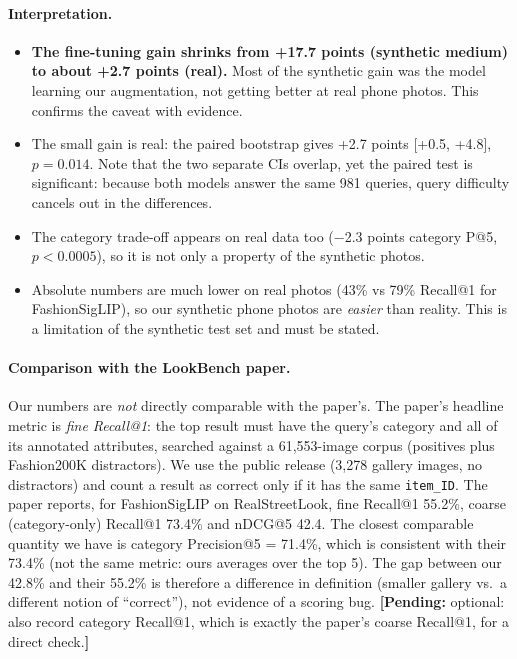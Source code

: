 \documentclass[11pt,a4paper]{article}
\newcommand{\pending}[1]{\textcolor{orange!80!black}{\textbf{[Pending:} #1\textbf{]}}}
\begin{document}
\paragraph{Interpretation.}
\begin{itemize}
  \item \textbf{The fine-tuning gain shrinks from +17.7 points (synthetic medium) to about +2.7
        points (real).} Most of the synthetic gain was the model learning our augmentation, not getting
        better at real phone photos. This confirms the caveat with evidence.
  \item The small gain is real: the paired bootstrap gives +2.7 points [+0.5, +4.8], $p=0.014$.
        Note that the two separate CIs overlap, yet the paired test is significant: because both models
        answer the same 981 queries, query difficulty cancels out in the differences.
  \item The category trade-off appears on real data too ($-$2.3 points category P@5, $p<0.0005$),
        so it is not only a property of the synthetic photos.
  \item Absolute numbers are much lower on real photos (43\% vs 79\% Recall@1 for FashionSigLIP),
        so our synthetic phone photos are \emph{easier} than reality. This is a limitation of the
        synthetic test set and must be stated.
\end{itemize}
\paragraph{Comparison with the LookBench paper.} Our numbers are \emph{not} directly comparable with
the paper's. The paper's headline metric is \emph{fine Recall@1}: the top result must have the query's
category and all of its annotated attributes, searched against a 61,553-image corpus (positives plus
Fashion200K distractors). We use the public release (3,278 gallery images, no distractors) and count a
result as correct only if it has the same \texttt{item\_ID}. The paper reports, for FashionSigLIP on
RealStreetLook, fine Recall@1 55.2\%, coarse (category-only) Recall@1 73.4\% and nDCG@5 42.4. The closest
comparable quantity we have is category Precision@5 = 71.4\%, which is consistent with their 73.4\%
(not the same metric: ours averages over the top 5). The gap between our 42.8\% and their 55.2\% is
therefore a difference in definition (smaller gallery vs.\ a different notion of ``correct''), not
evidence of a scoring bug. \pending{optional: also record category Recall@1, which is exactly the
paper's coarse Recall@1, for a direct check.}
\end{document}
